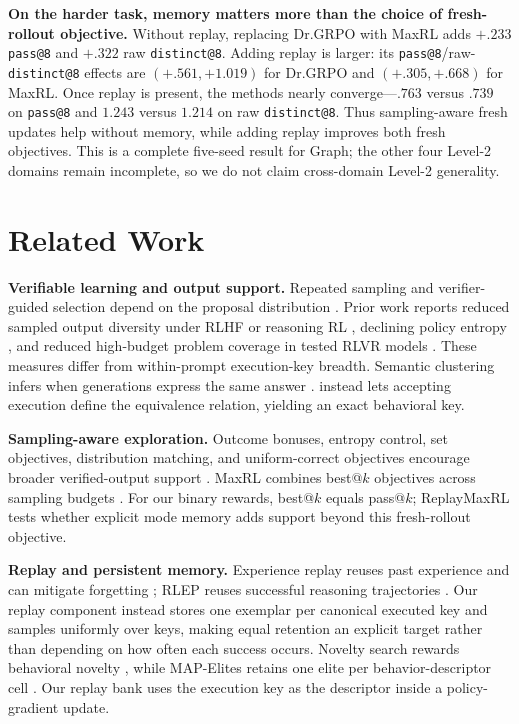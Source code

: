 \textbf{On the harder task, memory matters more than the choice of fresh-rollout
objective.} Without replay, replacing Dr.GRPO with MaxRL adds \(+.233\)
\texttt{pass@8} and \(+.322\) raw \texttt{distinct@8}. Adding replay is larger:
its \texttt{pass@8}/raw-\texttt{distinct@8} effects are
\((+.561,+1.019)\) for Dr.GRPO and \((+.305,+.668)\) for MaxRL. Once replay
is present, the methods nearly converge---\(.763\)
versus \(.739\) on \texttt{pass@8} and \(1.243\) versus \(1.214\) on raw
\texttt{distinct@8}. Thus sampling-aware fresh updates help without memory,
while adding replay improves both fresh objectives. This is a complete five-seed result for Graph;
the other four Level-2 domains remain incomplete, so we do not claim
cross-domain Level-2 generality.



\section{Related Work}
\label{sec:related}

\noindent\textbf{Verifiable learning and output support.}
Repeated sampling and verifier-guided selection depend on the proposal
distribution \citep{brown2024monkeys,snell2024testtime}. Prior work reports
reduced sampled output diversity under RLHF or reasoning RL
\citep{kirk2024understanding,dang2025diversity}, declining policy entropy
\citep{cui2025entropy}, and reduced high-budget problem coverage in tested RLVR
models \citep{yue2025rlvrlimit}. These measures differ from within-prompt
execution-key breadth. Semantic clustering infers when generations express the same answer
\citep{farquhar2024detecting}. \mb{} instead lets accepting execution define
the equivalence relation, yielding an exact behavioral key.

\noindent\textbf{Sampling-aware exploration.}
Outcome bonuses, entropy control, set objectives, distribution matching, and
uniform-correct objectives encourage broader verified-output support
\citep{song2025outcome,chen2025passktraining,li2025divergence,
li2026setpo,li2026distribution,lochab2026ucpo}. MaxRL combines
best@\(k\) objectives across sampling budgets \citep{tajwar2026maxrl}.
For our binary rewards, best@\(k\) equals pass@\(k\); ReplayMaxRL tests
whether explicit mode memory adds support beyond this fresh-rollout objective.

\noindent\textbf{Replay and persistent memory.}
Experience replay reuses past experience and can mitigate forgetting
\citep{lin1992selfimproving,rolnick2019replay}; RLEP reuses successful
reasoning trajectories \citep{zhang2025rlep}. Our replay component instead stores one exemplar per canonical executed key and
samples uniformly over keys, making equal retention an explicit target rather
than depending on how often each success occurs. Novelty search rewards behavioral novelty
\citep{lehman2011novelty}, while MAP-Elites retains one elite per behavior-descriptor
cell \citep{mouret2015illuminating}. Our replay bank uses the execution key
as the descriptor inside a policy-gradient update.



